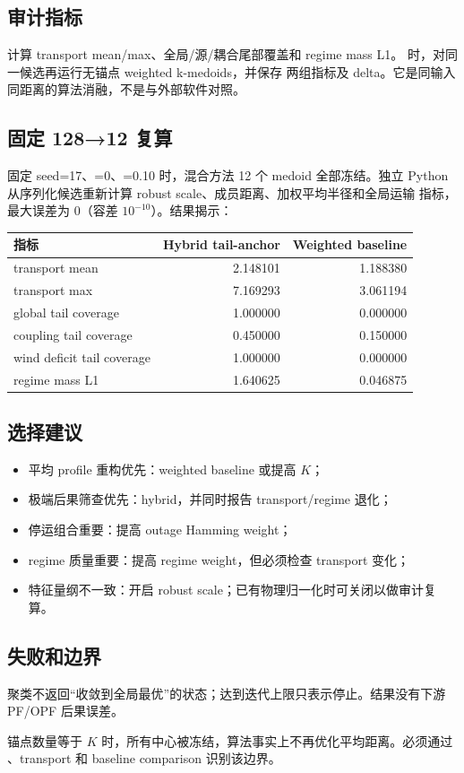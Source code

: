 \subsection{审计指标}
 计算 transport mean/max、全局/源/耦合尾部覆盖和 regime
mass L1。 时，对同一候选再运行无锚点 weighted k-medoids，并保存
两组指标及 delta。它是同输入同距离的算法消融，不是与外部软件对照。

\subsection{固定 128→12 复算}
固定 seed=17、=0、=0.10 时，混合方法 12 个 medoid
全部冻结。独立 Python 从序列化候选重新计算 robust scale、成员距离、加权平均半径和全局运输
指标，最大误差为 0（容差 $10^{-10}$）。结果揭示：
\begin{center}\small
\begin{tabular}{@{}L{4.4cm}rr@{}}
\toprule
指标 & Hybrid tail-anchor & Weighted baseline\\
\midrule
transport mean & 2.148101 & 1.188380\\
transport max & 7.169293 & 3.061194\\
global tail coverage & 1.000000 & 0.000000\\
coupling tail coverage & 0.450000 & 0.150000\\
wind deficit tail coverage & 1.000000 & 0.000000\\
regime mass L1 & 1.640625 & 0.046875\\
\bottomrule
\end{tabular}
\end{center}

\subsection{选择建议}
\begin{itemize}
  \item 平均 profile 重构优先：weighted baseline 或提高 $K$；
  \item 极端后果筛查优先：hybrid，并同时报告 transport/regime 退化；
  \item 停运组合重要：提高 outage Hamming weight；
  \item regime 质量重要：提高 regime weight，但必须检查 transport 变化；
  \item 特征量纲不一致：开启 robust scale；已有物理归一化时可关闭以做审计复算。
\end{itemize}

\subsection{失败和边界}
聚类不返回“收敛到全局最优”的状态；达到迭代上限只表示停止。结果没有下游 PF/OPF 后果误差。
\begin{gapnote}
锚点数量等于 $K$ 时，所有中心被冻结，算法事实上不再优化平均距离。必须通过
、transport 和 baseline comparison 识别该边界。
\end{gapnote}
